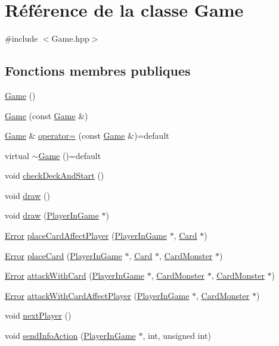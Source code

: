 \hypertarget{classGame}{}\section{Référence de la classe Game}
\label{classGame}


{\ttfamily \#include $<$Game.\+hpp$>$}

\subsection*{Fonctions membres publiques}
\begin{DoxyCompactItemize}
\item 
\hyperlink{classGame_ad59df6562a58a614fda24622d3715b65}{Game} ()
\item 
\hyperlink{classGame_aa79443880de5f26387c2a1c70c8c1aae}{Game} (const \hyperlink{classGame}{Game} \&)
\item 
\hyperlink{classGame}{Game} \& \hyperlink{classGame_a5e2d7c75effddbacf32883492a64d8d4}{operator=} (const \hyperlink{classGame}{Game} \&)=default
\item 
virtual \hyperlink{classGame_ab0556d428e8db075b405355af7e81dae}{$\sim$\+Game} ()=default
\item 
void \hyperlink{classGame_a41a8233a0473e2e3687d0380c9b2bccb}{check\+Deck\+And\+Start} ()
\item 
void \hyperlink{classGame_a6d54497ce3a66f6dd45eacfdccc8d0bd}{draw} ()
\item 
void \hyperlink{classGame_a0e5055bedff4cda4488c97e5d20ae647}{draw} (\hyperlink{classPlayerInGame}{Player\+In\+Game} $\ast$)
\item 
\hyperlink{Error_8hpp_a2c3e4bb40f36b262a5214e2da2bca9c5}{Error} \hyperlink{classGame_a2395757098b2684235751b0675e0bf1d}{place\+Card\+Affect\+Player} (\hyperlink{classPlayerInGame}{Player\+In\+Game} $\ast$, \hyperlink{classCard}{Card} $\ast$)
\item 
\hyperlink{Error_8hpp_a2c3e4bb40f36b262a5214e2da2bca9c5}{Error} \hyperlink{classGame_acc43da7befc9a1d6a5a806e1c67007f2}{place\+Card} (\hyperlink{classPlayerInGame}{Player\+In\+Game} $\ast$, \hyperlink{classCard}{Card} $\ast$, \hyperlink{classCardMonster}{Card\+Monster} $\ast$)
\item 
\hyperlink{Error_8hpp_a2c3e4bb40f36b262a5214e2da2bca9c5}{Error} \hyperlink{classGame_a579b2a86d407b6d6329c175bb17e1b85}{attack\+With\+Card} (\hyperlink{classPlayerInGame}{Player\+In\+Game} $\ast$, \hyperlink{classCardMonster}{Card\+Monster} $\ast$, \hyperlink{classCardMonster}{Card\+Monster} $\ast$)
\item 
\hyperlink{Error_8hpp_a2c3e4bb40f36b262a5214e2da2bca9c5}{Error} \hyperlink{classGame_a68812012d1e9dacc27bbbc0304000854}{attack\+With\+Card\+Affect\+Player} (\hyperlink{classPlayerInGame}{Player\+In\+Game} $\ast$, \hyperlink{classCardMonster}{Card\+Monster} $\ast$)
\item 
void \hyperlink{classGame_aa5b09732ecd16afc3cd6d3f580366237}{next\+Player} ()
\item 
void \hyperlink{classGame_a06760f118a7f3808d9038645e2abf64f}{send\+Info\+Action} (\hyperlink{classPlayerInGame}{Player\+In\+Game} $\ast$, int, unsigned int)
\end{DoxyCompactItemize}
